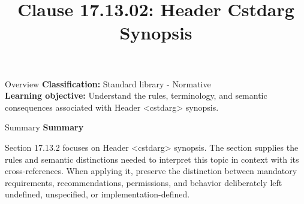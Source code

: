 \documentclass[10pt,letterpaper]{article}
\title{Clause 17.13.02: Header Cstdarg Synopsis}
\author{}
\date{}
\begin{document}
\maketitle
\begin{CornellOverviewBox}{Overview}
\textbf{Classification:} Standard library - Normative\\[2pt]
\textbf{Learning objective:} Understand the rules, terminology, and semantic consequences associated with Header <cstdarg> synopsis.
\end{CornellOverviewBox}\begin{CornellSummaryBox}{Summary}
{\sffamily\bfseries\color{Accent} Summary}\par\vspace{3pt}Section 17.13.2 focuses on Header <cstdarg> synopsis. The section supplies the rules and semantic distinctions needed to interpret this topic in context with its cross-references. When applying it, preserve the distinction between mandatory requirements, recommendations, permissions, and behavior deliberately left undefined, unspecified, or implementation-defined.
\end{CornellSummaryBox}
\end{document}
